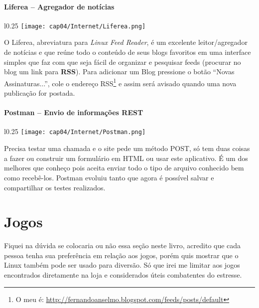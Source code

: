 \paragraph{Liferea – Agregador de notícias}
\begin{minipage}{\linewidth}
 \vspace{5pt}
 \begin{wrapfigure}{l}{0.25\textwidth}
  \vspace{-\baselineskip}
  \texttt{[image: cap04/Internet/Liferea.png]} 
 \end{wrapfigure}
 O Liferea, abreviatura para \textit{Linux Feed Reader}, é um excelente leitor/agregador de notícias e que reúne todo o conteúdo de seus blogs favoritos em uma interface simples que faz com que seja fácil de organizar e pesquisar feeds (procurar no blog um link para \textbf{RSS}). Para adicionar um Blog pressione o botão ``Novas Assinaturas...'', cole o endereço RSS\footnote{O meu é: \url{http://fernandoanselmo.blogspot.com/feeds/posts/default}} e assim será avisado quando uma nova publicação for postada.
\end{minipage}

\paragraph{Postman – Envio de informações REST}
\begin{minipage}{\linewidth}
 \vspace{5pt}
 \begin{wrapfigure}{l}{0.25\textwidth}
  \vspace{-\baselineskip}
  \texttt{[image: cap04/Internet/Postman.png]} 
 \end{wrapfigure}
 Precisa testar uma chamada e o site pede um método POST, só tem duas coisas a fazer ou construir um formulário em HTML ou usar este aplicativo. É um dos melhores que conheço pois aceita enviar todo o tipo de arquivo conhecido bem como recebê-los. Postman evoluiu tanto que agora é possível salvar e compartilhar os testes realizados.
\end{minipage}

\section{Jogos}
Fiquei na dúvida se colocaria ou não essa seção neste livro, acredito que cada pessoa tenha sua preferência em relação aos jogos, porém quis mostrar que o Linux também pode ser usado para diversão. Só que irei me limitar aos jogos encontrados diretamente na loja e considerados úteis combatentes do estresse.

